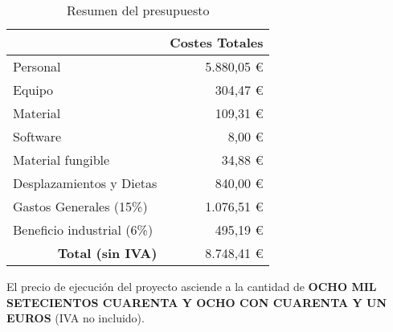 \begin{table}[H]
	\centering
	\caption{Resumen del presupuesto}
	\label{tab:presupuesto_total}
	\begin{tabular}{l|r|}
		\hline
		\rowcolor[HTML]{BFBFBF}
		\multicolumn{1}{|c|}{\cellcolor[HTML]{BFBFBF}\textbf{Presupuestos}} & \multicolumn{1}{c|}{\cellcolor[HTML]{BFBFBF}\textbf{Costes Totales}} \\ \hline
		\multicolumn{1}{|l|}{Personal}                                      & 5.880,05 €                                                           \\ \hline
		\multicolumn{1}{|l|}{Equipo}                                        & 304,47 €                                                             \\ \hline
		\multicolumn{1}{|l|}{Material}                                      & 109,31 €                                                             \\ \hline
		\multicolumn{1}{|l|}{Software}                                      & 8,00 €                                                               \\ \hline
		\multicolumn{1}{|l|}{Material fungible}                             & 34,88 €                                                              \\ \hline
		\multicolumn{1}{|l|}{Desplazamientos y Dietas}                      & 840,00 €                                                             \\ \hline
		\multicolumn{1}{|l|}{Gastos Generales (15\%)}                       & 1.076,51 €                                                           \\ \hline
		\multicolumn{1}{|l|}{Beneficio industrial (6\%)}                    & 495,19 €                                                             \\ \hline
		\multicolumn{1}{r|}{\textbf{Total (sin IVA)}}                       & 8.748,41 €                                                           \\ \cline{2-2}
	\end{tabular}
\end{table}

\noindent
El precio de ejecución del proyecto asciende a la cantidad de \MakeUppercase{\textbf{ocho mil setecientos cuarenta y ocho con cuarenta y un euros}} (IVA no incluido).